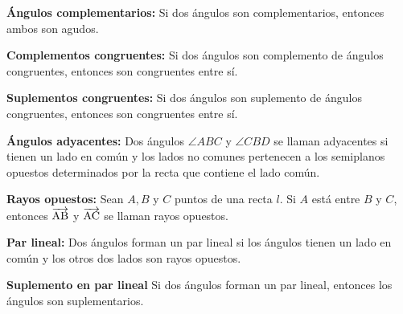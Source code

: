\begin{theorem}{\textbf{Ángulos complementarios:}}
    Si dos ángulos son complementarios, entonces ambos son agudos.
\end{theorem}

\begin{theorem}{\textbf{Complementos congruentes:}}
    Si dos ángulos son complemento de ángulos congruentes, entonces son congruentes entre sí.
\end{theorem}

\begin{theorem}{\textbf{Suplementos congruentes:}}
    Si dos ángulos son suplemento de ángulos congruentes, entonces son congruentes entre sí.
\end{theorem}

\begin{definition}{\textbf{Ángulos adyacentes:}}
    Dos ángulos $\angle{ABC}$ y $\angle{CBD}$ se llaman adyacentes si tienen un lado en común y los lados no comunes pertenecen a los semiplanos opuestos determinados por la recta que contiene el lado común.
\end{definition}

\begin{definition}{\textbf{Rayos opuestos:}}
    Sean $A,B$ y $C$ puntos de una recta $l$. Si $A$ está entre $B$ y $C$, entonces $\overrightarrow{\rm AB}$ y $\overrightarrow{\rm AC}$ se llaman rayos opuestos.

    \begin{figure}[!h]
        \centering
        
        \label{fig:oposing-rays}
    \end{figure}
    
\end{definition}

\begin{definition}{\textbf{Par lineal:}}
    Dos ángulos forman un par lineal si los ángulos tienen un lado en común y los otros dos lados son rayos opuestos.

    \begin{figure}[!h]
        \centering
        
        \label{fig:linear-pair}
    \end{figure}    
    
\end{definition}

\begin{postulate}{\textbf{Suplemento en par lineal}}
    Si dos ángulos forman un par lineal, entonces los ángulos son suplementarios.
\end{postulate}


